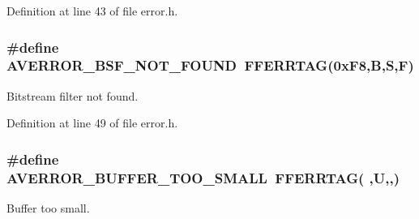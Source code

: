 Definition at line 43 of file error.\+h.

\subsubsection[{\texorpdfstring{A\+V\+E\+R\+R\+O\+R\+\_\+\+B\+S\+F\+\_\+\+N\+O\+T\+\_\+\+F\+O\+U\+ND}{AVERROR_BSF_NOT_FOUND}}]{\setlength{\rightskip}{0pt plus 5cm}\#define A\+V\+E\+R\+R\+O\+R\+\_\+\+B\+S\+F\+\_\+\+N\+O\+T\+\_\+\+F\+O\+U\+ND~{\bf F\+F\+E\+R\+R\+T\+AG}(0x\+F8,\textquotesingle{}\+B\textquotesingle{},\textquotesingle{}\+S\textquotesingle{},\textquotesingle{}\+F\textquotesingle{})}\hypertarget{group__lavu__error_ga586e134e9dad8f57a218b2cd8734b601}{}\label{group__lavu__error_ga586e134e9dad8f57a218b2cd8734b601}


Bitstream filter not found. 



Definition at line 49 of file error.\+h.

\subsubsection[{\texorpdfstring{A\+V\+E\+R\+R\+O\+R\+\_\+\+B\+U\+F\+F\+E\+R\+\_\+\+T\+O\+O\+\_\+\+S\+M\+A\+LL}{AVERROR_BUFFER_TOO_SMALL}}]{\setlength{\rightskip}{0pt plus 5cm}\#define A\+V\+E\+R\+R\+O\+R\+\_\+\+B\+U\+F\+F\+E\+R\+\_\+\+T\+O\+O\+\_\+\+S\+M\+A\+LL~{\bf F\+F\+E\+R\+R\+T\+AG}( \textquotesingle{},\textquotesingle{}U\textquotesingle{},\textquotesingle{},\textquotesingle{})}\hypertarget{group__lavu__error_ga76077a6d42ee211f59712485bd977e40}{}\label{group__lavu__error_ga76077a6d42ee211f59712485bd977e40}


Buffer too small. 




